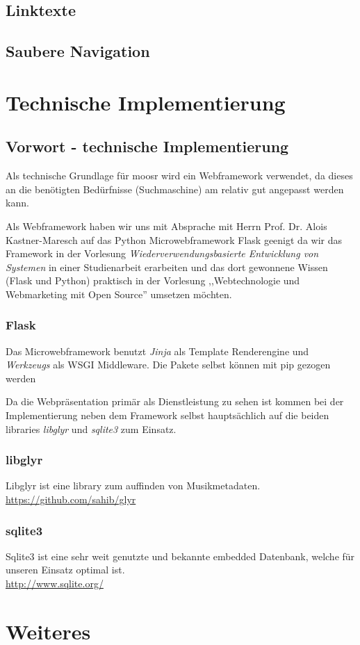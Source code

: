 \documentclass[11pt]{scrreprt}
\begin{document}
\section{Linktexte}
\section{Saubere Navigation}


\chapter{Technische Implementierung}
\section{Vorwort - technische Implementierung}
Als technische Grundlage für moosr wird ein Webframework verwendet, da dieses an
die benötigten Bedürfnisse (Suchmaschine) am relativ gut angepasst werden kann.

Als Webframework haben wir uns mit Absprache mit Herrn Prof. Dr. Alois
Kastner-Maresch auf das Python Microwebframework Flask geenigt da wir das
Framework in der Vorlesung \emph{Wiederverwendungsbasierte Entwicklung von
Systemen} in einer Studienarbeit erarbeiten und das dort gewonnene Wissen (Flask
und Python) praktisch in der Vorlesung ,,Webtechnologie und Webmarketing 
mit Open Source'' umsetzen möchten.

\subsection{Flask}
Das Microwebframework benutzt \emph{Jinja} als Template Renderengine und
\emph{Werkzeugs} als WSGI Middleware. Die Pakete selbst können mit pip gezogen
werden


Da die Webpräsentation primär als Dienstleistung zu sehen ist kommen bei der
Implementierung neben dem Framework selbst hauptsächlich auf die beiden
libraries \emph{libglyr} und \emph{sqlite3} zum Einsatz.

\subsection{libglyr}
Libglyr ist eine library zum auffinden von Musikmetadaten. 
\\
    \url{https://github.com/sahib/glyr}


\subsection{sqlite3}
Sqlite3 ist eine sehr weit genutzte und bekannte embedded Datenbank, welche für
unseren Einsatz optimal ist.
\\
\url{http://www.sqlite.org/}

\chapter{Weiteres}
\end{document}
